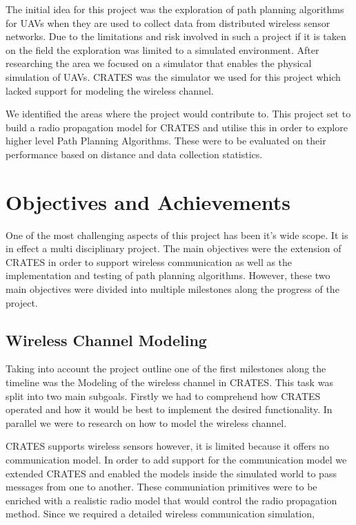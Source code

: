 The initial idea for this project was the exploration of path planning
algorithms for UAVs when they are used to collect data from distributed wireless
sensor networks. Due to the limitations and risk involved in such a project if it
is taken on the field the exploration was limited to a simulated environment.
After researching the area we focused on a simulator that enables the physical
simulation of UAVs. CRATES was the simulator we used for this project which
lacked support for modeling the wireless channel.

We identified the areas where the project would contribute to. This project set
to build a radio propagation model for CRATES and utilise this in order to
explore higher level Path Planning Algorithms. These were to be evaluated on
their performance based on distance and data collection statistics.


\section{Objectives and Achievements}
One of the most challenging aspects of this project has been it's wide scope. It
is in effect a multi disciplinary project. The main objectives were the
extension of CRATES in order to support wireless communication as well as
the implementation and testing of path planning algorithms. However, these two
main objectives were divided into multiple milestones along the progress of the
project.

\subsection{Wireless Channel Modeling}
Taking into account the project outline one of the first milestones along the
timeline was the Modeling of the wireless channel in CRATES. This task was split
into two main subgoals. Firstly we had to comprehend how CRATES operated and how
it would be best to implement the desired functionality. In parallel we were to
research on how to model the wireless channel.

CRATES supports wireless sensors however, it is limited because it offers no
communication model. In order to add support for the communication model we
extended CRATES and enabled the models inside the simulated world to pass
messages from one to another. These communiation primitives were to be enriched
with a realistic radio model that would control the radio propagation method.
Since we required a detailed wireless communication simulation,








